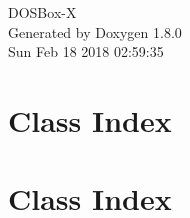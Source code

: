 \documentclass{book}
\begin{document}
\hypersetup{pageanchor=false,citecolor=blue}
\begin{titlepage}
\vspace*{7cm}
\begin{center}
{\Large D\-O\-S\-Box-\/\-X }\\
\vspace*{1cm}
{\large Generated by Doxygen 1.8.0}\\
\vspace*{0.5cm}
{\small Sun Feb 18 2018 02:59:35}\\
\end{center}
\end{titlepage}
\clearemptydoublepage
{}
\tableofcontents
\clearemptydoublepage
{}
\hypersetup{pageanchor=true,citecolor=blue}
\chapter{Class Index}

\chapter{Class Index}

\end{document}
